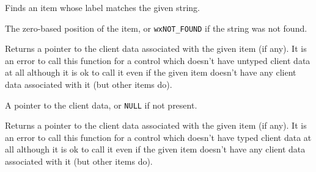 



\label{wxcontrolwithitemsfindstring}


Finds an item whose label matches the given string.




The zero-based position of the item, or {\tt wxNOT\_FOUND} if the string was
not found.


\label{wxcontrolwithitemsgetclientdata}


Returns a pointer to the client data associated with the given item (if any).
It is an error to call this function for a control which doesn't have untyped
client data at all although it is ok to call it even if the given item doesn't
have any client data associated with it (but other items do).




A pointer to the client data, or {\tt NULL} if not present.


\label{wxcontrolwithitemsgetclientobject}


Returns a pointer to the client data associated with the given item (if any).
It is an error to call this function for a control which doesn't have typed
client data at all although it is ok to call it even if the given item doesn't
have any client data associated with it (but other items do).




